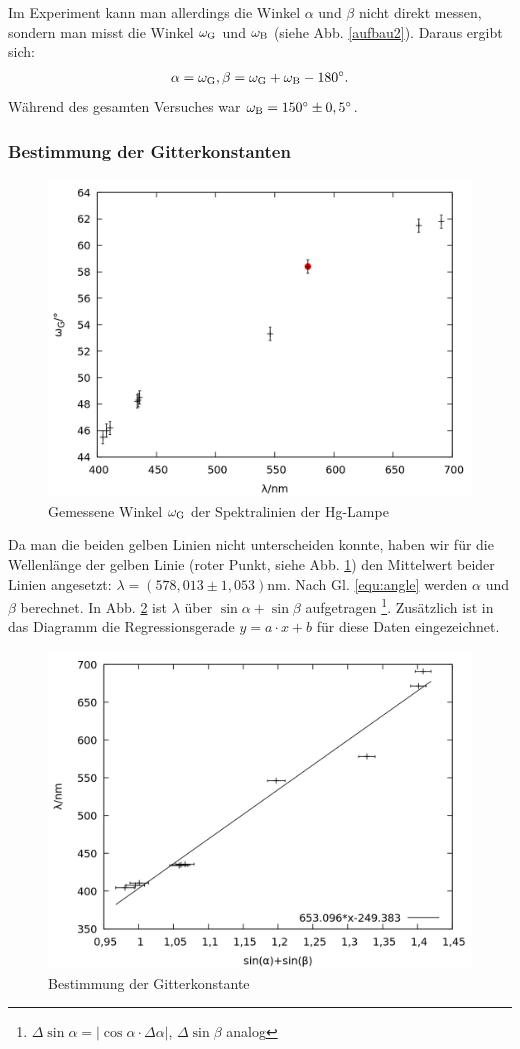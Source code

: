 Im Experiment kann man allerdings die Winkel $\alpha$ und $\beta$ nicht direkt messen, sondern man misst die Winkel $\omega_\mathrm{G}$ und $\omega_\mathrm{B}$ (siehe Abb. \ref{aufbau2}). Daraus ergibt sich:
\begin{align}
\alpha = \omega_\mathrm{G}, \beta = \omega_\mathrm{G}+\omega_\mathrm{B}-180^\circ.
\label{equ:angle}
\end{align}
Während des gesamten Versuches war $\omega_\mathrm{B}=150^\circ \pm 0,5^\circ$.

\subsubsection{Bestimmung der Gitterkonstanten}
\begin{figure}[h]
  \centering
  \includegraphics[width=0.75\linewidth]{data/Balmer/out_hg_raw.png}
  \caption{Gemessene Winkel $\omega_\mathrm{G}$ der Spektralinien der Hg-Lampe}
  \label{fig:hg_raw}
\end{figure}

Da man die beiden gelben Linien nicht unterscheiden konnte, haben wir für die Wellenlänge der gelben Linie (roter Punkt, siehe Abb. \ref{fig:hg_raw}) den Mittelwert beider Linien angesetzt: $\lambda = \si{(578,013 \pm 1,053) \nano \metre}$. Nach Gl. \ref{equ:angle} werden $\alpha$ und $\beta$ berechnet. In Abb. \ref{fig:hg} ist $\lambda$ über $\sin{\alpha} + \sin{\beta}$ aufgetragen \footnote{$\Delta \sin{\alpha} = |\cos{\alpha} \cdot \Delta \alpha|$, $\Delta \sin \beta$ analog}. Zusätzlich ist in das Diagramm die Regressionsgerade $y = a\cdot x + b$ für diese Daten eingezeichnet.
\begin{figure}[h]
  \centering
  \includegraphics[width=0.75\linewidth]{data/Balmer/out_hg.png}
  \caption{Bestimmung der Gitterkonstante}
  \label{fig:hg}
\end{figure}

